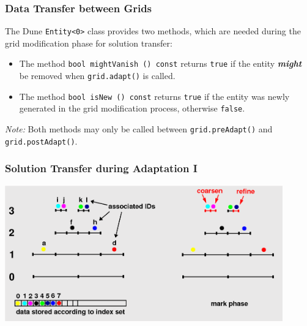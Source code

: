 \begin{frame}
  \frametitle{Data Transfer between Grids}

  The {\sc Dune} \lstinline{Entity<0>} class provides two methods, which are
  needed during the grid modification phase for solution transfer:
  \begin{itemize}
    \item The method\newline
      \lstinline{bool mightVanish () const}\newline
      returns \lstinline{true} if the entity {\bf \emph{might}} be removed when
      \lstinline{grid.adapt()} is called. 

      \pause

    \item The method\newline
      \lstinline{bool isNew () const}\newline
      returns \lstinline{true} if the entity was newly generated in the
      grid modification process, otherwise \lstinline{false}.
  \end{itemize}

  \pause

  \begin{block}{\emph{Note:}}
    Both methods may only be called between \lstinline{grid.preAdapt()}
    and \lstinline{grid.postAdapt()}.
  \end{block}

\end{frame}

\begin{frame}
  \frametitle{Solution Transfer during Adaptation I}  

  \begin{center}
    \includegraphics[width=0.9\textwidth]{EPS/adaptivity/hadapt}
  \end{center}

\end{frame}

